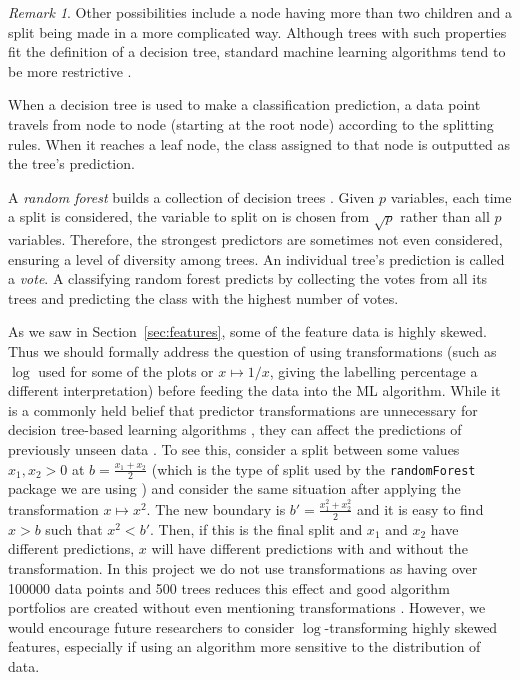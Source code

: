 \documentclass{l4proj}
\theoremstyle{definition}
\theoremstyle{remark}
\newtheorem{remark}{Remark}[chapter]
\begin{document}
\begin{remark}
  Other possibilities include a node having more than two children and a split
  being made in a more complicated way. Although trees with such properties fit
  the definition of a decision tree, standard machine learning algorithms tend
  to be more restrictive \cite{James:2014:ISL:2517747,
    DBLP:series/smpai/RokachM14}.
\end{remark}

When a decision tree is used to make a classification prediction, a data point
travels from node to node (starting at the root node) according to the splitting
rules. When it reaches a leaf node, the class assigned to that node is outputted
as the tree's prediction.

A \emph{random forest} builds a collection of decision trees
\cite{James:2014:ISL:2517747}. Given $p$ variables, each time a split is
considered, the variable to split on is chosen from $\sqrt{p}$ rather than all
$p$ variables. Therefore, the strongest predictors are sometimes not even
considered, ensuring a level of diversity among trees. An individual tree's
prediction is called a \emph{vote}. A classifying random forest predicts by
collecting the votes from all its trees and predicting the class with the
highest number of votes.

As we saw in Section~\ref{sec:features}, some of the feature data is highly
skewed. Thus we should formally address the question of using transformations
(such as $\log$ used for some of the plots or $x \mapsto 1/x$, giving
the labelling percentage a different interpretation) before feeding the
data into the ML algorithm. While it is a commonly held belief that
predictor transformations are unnecessary for decision tree-based learning
algorithms \cite{DBLP:journals/classification/Friedman06,
  DBLP:books/lib/HastieTF09, cart}, they can affect the predictions of
previously unseen data \cite{DBLP:journals/corr/GaliliM16}. To see this,
consider a split between some values $x_1, x_2 > 0$ at $b =
\frac{x_1+x_2}{2}$ (which is the type of split used by the
\texttt{randomForest} package we are using
\cite{DBLP:journals/corr/GaliliM16}) and consider the same situation after
applying the transformation $x \mapsto x^2$. The new boundary is $b' =
\frac{x_1^2+x_2^2}{2}$ and it is easy to find $x > b$ such that $x^2 < b'$.
Then, if this is the final split and $x_1$ and $x_2$ have different predictions,
$x$ will have different predictions with and without the transformation. In
this project we do not use transformations as having over \num{100000} data
points and 500 trees reduces this effect and good algorithm portfolios are
created without even mentioning transformations
\cite{DBLP:conf/lion/KotthoffKHT15, DBLP:conf/lion/KotthoffMS16}. However, we
would encourage future researchers to consider $\log$-transforming highly skewed
features, especially if using an algorithm more sensitive to the distribution of
data.
\end{document}
